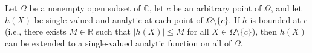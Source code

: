 Let $\Omega$ be a nonempty open subset of $\mathbb{C}$, let $c$ be an arbitrary point of $\Omega$, and let $h(X)$ be single-valued and analytic at each point of $\Omega \setminus \{c\}$. If $h$ is bounded at $c$ (i.e., there exists $M \in \mathbb{R}$ such that $|h(X)| \leq M$ for all $X \in \Omega \setminus \{c\}$), then $h(X)$ can be extended to a single-valued analytic function on all of $\Omega$.
